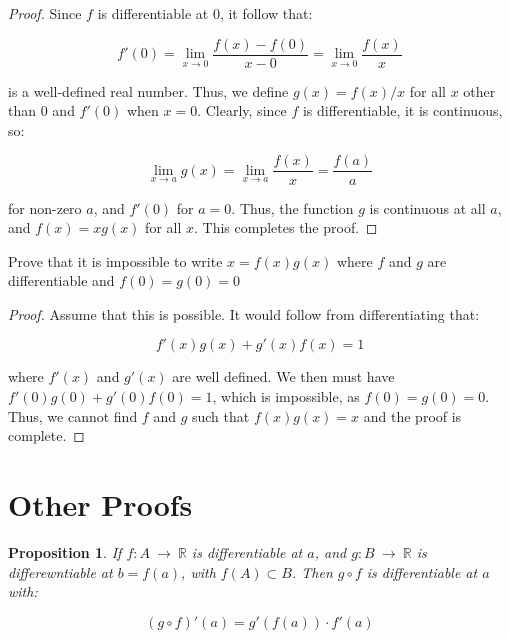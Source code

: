 \documentclass[10pt, oneside]{article}
\newenvironment{problem}[2][Problem]{\begin{trivlist}
\item[\hskip \labelsep {\bfseries #1}\hskip \labelsep {\bfseries #2.}]}{\end{trivlist}}
\newtheorem{prop}{Proposition}
\begin{document}
    \begin{proof}
      Since $f$ is differentiable at $0$, it follow that:

      $$f'(0) = \lim_{x \to 0} \frac{f(x) - f(0)}{x - 0} = \lim_{x \to 0} \frac{f(x)}{x}$$

      is a well-defined real number. Thus, we define $g(x) = f(x)/x$ for all $x$ other than $0$ and $f'(0)$ when $x = 0$. Clearly, since
      $f$ is differentiable, it is continuous, so:

      $$\lim_{x \to a} g(x) = \lim_{x \to a} \frac{f(x)}{x} = \frac{f(a)}{a}$$

      for non-zero $a$, and $f'(0)$ for $a = 0$. Thus, the function $g$ is continuous at all $a$, and $f(x) = x g(x)$ for all $x$. This completes the proof.
    \end{proof}

    \begin{problem}{10.28}
      Prove that it is impossible to write $x = f(x) g(x)$ where $f$ and $g$ are differentiable and $f(0) = g(0) = 0$
    \end{problem}

    \begin{proof}
      Assume that this is possible. It would follow from differentiating that:

      $$f'(x) g(x) + g'(x) f(x) = 1$$

      where $f'(x)$ and $g'(x)$ are well defined. We then must have $f'(0) g(0) + g'(0) f(0) = 1$, which is impossible, as
      $f(0) = g(0) = 0$. Thus, we cannot find $f$ and $g$ such that $f(x) g(x) = x$ and the proof is complete.
    \end{proof}

    \section{Other Proofs}

    \begin{prop}
      If $f : A \ \rightarrow \ \mathbb{R}$ is differentiable at $a$, and $g : B \ \rightarrow \ \mathbb{R}$ is differewntiable at $b = f(a)$, with $f(A) \subset B$. Then
      $g \circ f$ is differentiable at $a$ with:

      $$(g \circ f)'(a) = g'(f(a)) \cdot f'(a)$$
    \end{prop}
\end{document}
